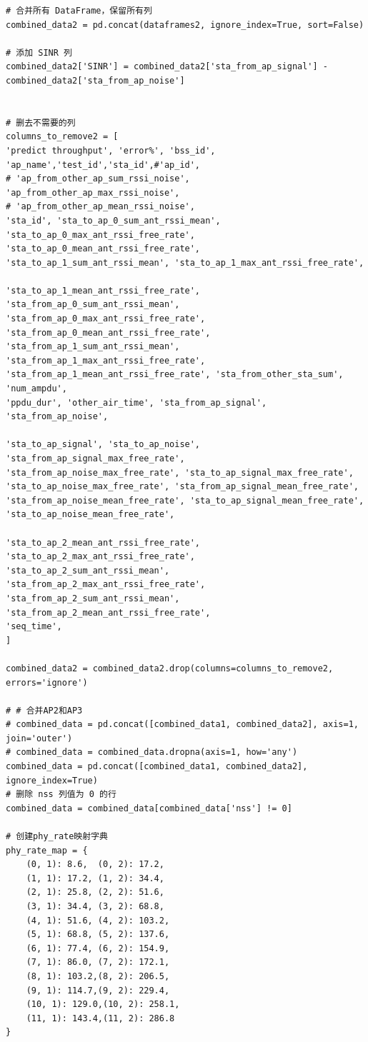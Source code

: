 \documentclass[bwprint]{gmcmthesis}
\begin{document}
\begin{lstlisting}
# 合并所有 DataFrame，保留所有列
combined_data2 = pd.concat(dataframes2, ignore_index=True, sort=False)

# 添加 SINR 列
combined_data2['SINR'] = combined_data2['sta_from_ap_signal'] - combined_data2['sta_from_ap_noise']


# 删去不需要的列
columns_to_remove2 = [
'predict throughput', 'error%', 'bss_id', 'ap_name','test_id','sta_id',#'ap_id',
# 'ap_from_other_ap_sum_rssi_noise', 'ap_from_other_ap_max_rssi_noise',
# 'ap_from_other_ap_mean_rssi_noise', 
'sta_id', 'sta_to_ap_0_sum_ant_rssi_mean',
'sta_to_ap_0_max_ant_rssi_free_rate', 'sta_to_ap_0_mean_ant_rssi_free_rate',
'sta_to_ap_1_sum_ant_rssi_mean', 'sta_to_ap_1_max_ant_rssi_free_rate',

'sta_to_ap_1_mean_ant_rssi_free_rate', 'sta_from_ap_0_sum_ant_rssi_mean',
'sta_from_ap_0_max_ant_rssi_free_rate', 'sta_from_ap_0_mean_ant_rssi_free_rate',
'sta_from_ap_1_sum_ant_rssi_mean', 'sta_from_ap_1_max_ant_rssi_free_rate',
'sta_from_ap_1_mean_ant_rssi_free_rate', 'sta_from_other_sta_sum', 'num_ampdu',
'ppdu_dur', 'other_air_time', 'sta_from_ap_signal', 'sta_from_ap_noise',

'sta_to_ap_signal', 'sta_to_ap_noise', 'sta_from_ap_signal_max_free_rate',
'sta_from_ap_noise_max_free_rate', 'sta_to_ap_signal_max_free_rate',
'sta_to_ap_noise_max_free_rate', 'sta_from_ap_signal_mean_free_rate',
'sta_from_ap_noise_mean_free_rate', 'sta_to_ap_signal_mean_free_rate',
'sta_to_ap_noise_mean_free_rate',

'sta_to_ap_2_mean_ant_rssi_free_rate', 'sta_to_ap_2_max_ant_rssi_free_rate',
'sta_to_ap_2_sum_ant_rssi_mean',           
'sta_from_ap_2_max_ant_rssi_free_rate',    
'sta_from_ap_2_sum_ant_rssi_mean',         
'sta_from_ap_2_mean_ant_rssi_free_rate',
'seq_time',
]

combined_data2 = combined_data2.drop(columns=columns_to_remove2, errors='ignore')

# # 合并AP2和AP3
# combined_data = pd.concat([combined_data1, combined_data2], axis=1, join='outer')
# combined_data = combined_data.dropna(axis=1, how='any')
combined_data = pd.concat([combined_data1, combined_data2], ignore_index=True)
# 删除 nss 列值为 0 的行
combined_data = combined_data[combined_data['nss'] != 0]

# 创建phy_rate映射字典
phy_rate_map = {
	(0, 1): 8.6,  (0, 2): 17.2,
	(1, 1): 17.2, (1, 2): 34.4,
	(2, 1): 25.8, (2, 2): 51.6,
	(3, 1): 34.4, (3, 2): 68.8,
	(4, 1): 51.6, (4, 2): 103.2,
	(5, 1): 68.8, (5, 2): 137.6,
	(6, 1): 77.4, (6, 2): 154.9,
	(7, 1): 86.0, (7, 2): 172.1,
	(8, 1): 103.2,(8, 2): 206.5,
	(9, 1): 114.7,(9, 2): 229.4,
	(10, 1): 129.0,(10, 2): 258.1,
	(11, 1): 143.4,(11, 2): 286.8
}


\end{lstlisting}
\end{document}
